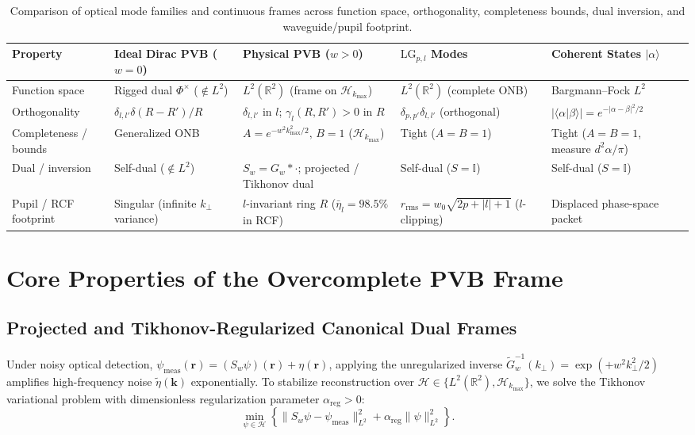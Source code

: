 \documentclass[aps,pra,onecolumn,notitlepage,11pt,tightenlines,amsmath,amssymb,floatfix,longbibliography]{revtex4-2}
\providecommand{\ket}[1]{\lvert#1\rangle}
\providecommand{\braket}[2]{\langle#1\vert#2\rangle}
\providecommand{\abs}[1]{\lvert#1\rvert}
\providecommand{\norm}[1]{\lVert#1\rVert}
\begin{document}
\begin{table}[htbp]
\caption{Comparison of optical mode families and continuous frames across function space, orthogonality, completeness bounds, dual inversion, and waveguide/pupil footprint.}
\label{tab:frame_comparison}
\begin{ruledtabular}
\footnotesize
\begin{tabular}{p{2.3cm}p{3.2cm}p{4.3cm}p{3.4cm}p{3.4cm}}
Property & Ideal Dirac PVB ($w=0$) & Physical PVB ($w>0$) & $\mathrm{LG}_{p,l}$ Modes & Coherent States $\ket{\alpha}$ \\
\hline
Function space & Rigged dual $\Phi^\times$ ($\notin L^2$) & $L^2(\mathbb{R}^2)$ (frame on $\mathcal{H}_{k_{\max}}$) & $L^2(\mathbb{R}^2)$ (complete ONB) & Bargmann--Fock $L^2$ \\
Orthogonality & $\delta_{l,l'}\delta(R-R')/R$ & $\delta_{l,l'}$ in $l$; $\gamma_l(R,R')>0$ in $R$ & $\delta_{p,p'}\delta_{l,l'}$ (orthogonal) & $\abs{\braket{\alpha}{\beta}} = e^{-\abs{\alpha-\beta}^2/2}$ \\
Completeness / bounds & Generalized ONB & $A = e^{-w^2 k_{\max}^2/2},\, B=1$ ($\mathcal{H}_{k_{\max}}$) & Tight ($A=B=1$) & Tight ($A=B=1$, measure $d^2\alpha/\pi$) \\
Dual / inversion & Self-dual ($\notin L^2$) & $S_w = G_w * \cdot$; projected / Tikhonov dual & Self-dual ($S=\mathbb{I}$) & Self-dual ($S=\mathbb{I}$) \\
Pupil / RCF footprint & Singular (infinite $k_\perp$ variance) & $l$-invariant ring $R$ ($\bar{\eta}_l = 98.5\%$ in RCF) & $r_{\mathrm{rms}} = w_0\sqrt{2p+\abs{l}+1}$ ($l$-clipping) & Displaced phase-space packet \\
\end{tabular}
\end{ruledtabular}
\end{table}

\section{Core Properties of the Overcomplete PVB Frame}
\label{sec:properties}

\subsection{Projected and Tikhonov-Regularized Canonical Dual Frames}
\label{subsec:tikhonov_dual}

Under noisy optical detection, $\psi_{\mathrm{meas}}(\mathbf{r}) = (S_w\psi)(\mathbf{r}) + \eta(\mathbf{r})$, applying the unregularized inverse $\widetilde{G}_w^{-1}(k_\perp) = \exp(+w^2 k_\perp^2/2)$ amplifies high-frequency noise $\widetilde{\eta}(\mathbf{k})$ exponentially. To stabilize reconstruction over $\mathcal{H} \in \{L^2(\mathbb{R}^2), \mathcal{H}_{k_{\max}}\}$, we solve the Tikhonov variational problem with dimensionless regularization parameter $\alpha_{\mathrm{reg}} > 0$:
\begin{equation}
\min_{\psi \in \mathcal{H}} \left\{ \norm{S_w\psi - \psi_{\mathrm{meas}}}_{L^2}^2 + \alpha_{\mathrm{reg}}\norm{\psi}_{L^2}^2 \right\}.
\label{eq:tikhonov_opt}
\end{equation}
\end{document}
